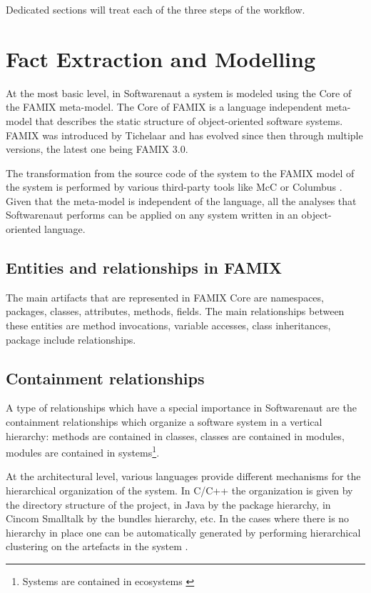 \documentclass[preprint,12pt]{elsarticle}
\begin{document}
Dedicated sections will treat each of the three steps of the workflow.




\newpage
\section {Fact Extraction and Modelling}
\label{sec:facts}


At the most basic level, in Softwarenaut a system is modeled using the Core of the FAMIX meta-model. The Core of FAMIX is a language independent meta-model that describes the static structure of object-oriented software systems. FAMIX was introduced by Tichelaar \cite{tichelaar-thesis} and has evolved since then through multiple versions, the latest one being FAMIX 3.0. 

The transformation from the source code of the system to the FAMIX model of the system is performed by various third-party tools like McC \cite{pepi-mcc} or Columbus \cite{ferenc-columbus}. Given that the meta-model is independent of the language, all the analyses that Softwarenaut performs can be applied on any system written in an object-oriented language.

\subsection {Entities and relationships in FAMIX}
The main artifacts that are represented in FAMIX Core are namespaces, packages, classes, attributes, methods, fields. The main relationships between these entities are method invocations, variable accesses, class inheritances, package include relationships. 

\subsection {Containment relationships}
A type of relationships which have a special importance in Softwarenaut are the containment relationships which organize a software system in a vertical hierarchy: methods are contained in classes, classes are contained in modules, modules are contained in systems\footnote{Systems are contained in ecosystems \cite{lungu-thesis}}. 

At the architectural level, various languages provide different mechanisms for the hierarchical organization of the system. In C/C++ the organization is given by the directory structure of the project, in Java by the package hierarchy, in Cincom Smalltalk by the bundles hierarchy, etc. In the cases where there is no hierarchy in place one can be automatically generated by performing hierarchical clustering on the artefacts in the system \cite{lungu-clust}. 
\end{document}
